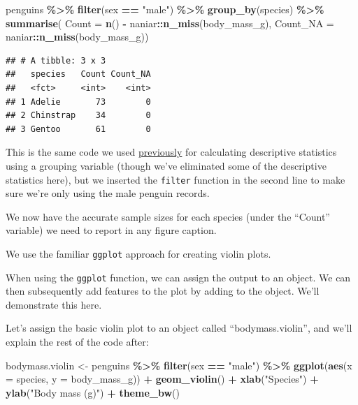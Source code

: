 \documentclass[
]{book}
\newenvironment{Shaded}{\begin{snugshade}}{\end{snugshade}}
\newcommand{\AttributeTok}[1]{\textcolor[rgb]{0.13,0.29,0.53}{#1}}
\newcommand{\FunctionTok}[1]{\textcolor[rgb]{0.13,0.29,0.53}{\textbf{#1}}}
\newcommand{\NormalTok}[1]{#1}
\newcommand{\OtherTok}[1]{\textcolor[rgb]{0.56,0.35,0.01}{#1}}
\newcommand{\SpecialCharTok}[1]{\textcolor[rgb]{0.81,0.36,0.00}{\textbf{#1}}}
\newcommand{\StringTok}[1]{\textcolor[rgb]{0.31,0.60,0.02}{#1}}
\begin{document}
\begin{Shaded}
\begin{Highlighting}[]
\NormalTok{penguins }\SpecialCharTok{\%\textgreater{}\%}
  \FunctionTok{filter}\NormalTok{(sex }\SpecialCharTok{==} \StringTok{"male"}\NormalTok{) }\SpecialCharTok{\%\textgreater{}\%}
  \FunctionTok{group\_by}\NormalTok{(species) }\SpecialCharTok{\%\textgreater{}\%}
  \FunctionTok{summarise}\NormalTok{(}
    \AttributeTok{Count =} \FunctionTok{n}\NormalTok{() }\SpecialCharTok{{-}}\NormalTok{ naniar}\SpecialCharTok{::}\FunctionTok{n\_miss}\NormalTok{(body\_mass\_g),}
    \AttributeTok{Count\_NA =}\NormalTok{ naniar}\SpecialCharTok{::}\FunctionTok{n\_miss}\NormalTok{(body\_mass\_g))}
\end{Highlighting}
\end{Shaded}

\begin{verbatim}
## # A tibble: 3 x 3
##   species   Count Count_NA
##   <fct>     <int>    <int>
## 1 Adelie       73        0
## 2 Chinstrap    34        0
## 3 Gentoo       61        0
\end{verbatim}

This is the same code we used \hyperref[desc_numeric_var_cat]{previously} for calculating descriptive statistics using a grouping variable (though we've eliminated some of the descriptive statistics here), but we inserted the \texttt{filter} function in the second line to make sure we're only using the male penguin records.

We now have the accurate sample sizes for each species (under the ``Count'' variable) we need to report in any figure caption.

We use the familiar \texttt{ggplot} approach for creating violin plots.

When using the \texttt{ggplot} function, we can assign the output to an object. We can then subsequently add features to the plot by adding to the object. We'll demonstrate this here.

Let's assign the basic violin plot to an object called ``bodymass.violin'', and we'll explain the rest of the code after:

\begin{Shaded}
\begin{Highlighting}[]
\NormalTok{bodymass.violin }\OtherTok{\textless{}{-}}\NormalTok{ penguins }\SpecialCharTok{\%\textgreater{}\%} 
  \FunctionTok{filter}\NormalTok{(sex }\SpecialCharTok{==} \StringTok{"male"}\NormalTok{) }\SpecialCharTok{\%\textgreater{}\%}
  \FunctionTok{ggplot}\NormalTok{(}\FunctionTok{aes}\NormalTok{(}\AttributeTok{x =}\NormalTok{ species, }\AttributeTok{y =}\NormalTok{ body\_mass\_g)) }\SpecialCharTok{+}
  \FunctionTok{geom\_violin}\NormalTok{() }\SpecialCharTok{+}
  \FunctionTok{xlab}\NormalTok{(}\StringTok{"Species"}\NormalTok{) }\SpecialCharTok{+}
  \FunctionTok{ylab}\NormalTok{(}\StringTok{"Body mass (g)"}\NormalTok{) }\SpecialCharTok{+}
  \FunctionTok{theme\_bw}\NormalTok{()}
\end{Highlighting}
\end{Shaded}
\end{document}
